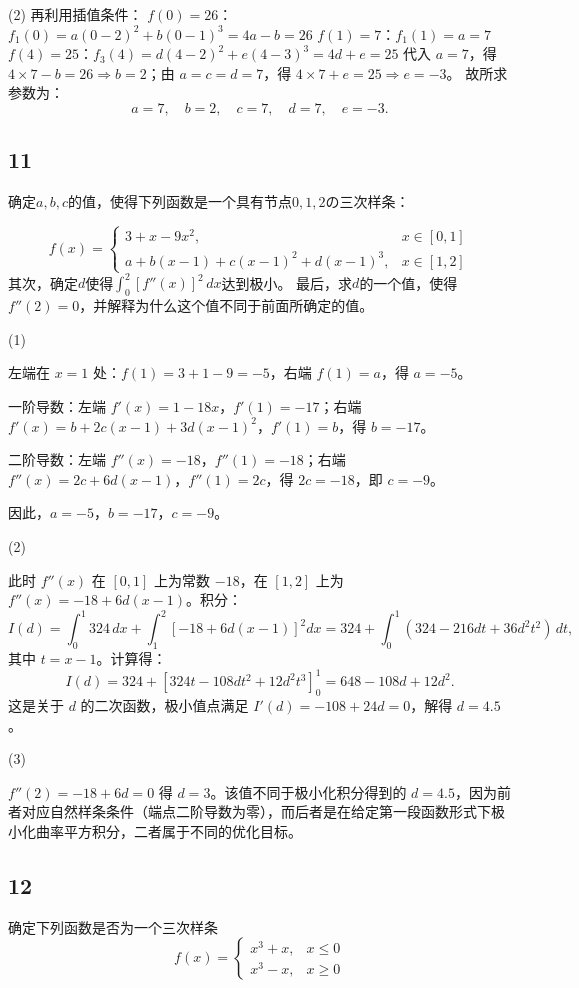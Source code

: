 \documentclass{article}
\begin{document}
(2)
再利用插值条件：
\(f(0)=26\)：\(f_1(0)=a(0-2)^2+b(0-1)^3=4a-b=26\)
\(f(1)=7\)：\(f_1(1)=a=7\)
\(f(4)=25\)：\(f_3(4)=d(4-2)^2+e(4-3)^3=4d+e=25\)
代入 \(a=7\)，得 \(4\times7-b=26\Rightarrow b=2\)；由 \(a=c=d=7\)，得 \(4\times7+e=25\Rightarrow e=-3\)。
故所求参数为：
\[
a=7,\quad b=2,\quad c=7,\quad d=7,\quad e=-3.
\]

\subsection*{11}
确定$a,b,c$的值，使得下列函数是一个具有节点$0,1,2$の三次样条：

\[
f(x)=\begin{cases}
3+x-9x^2, & x\in[0,1] \\[2pt]
a+b(x-1)+c(x-1)^2+d(x-1)^3, & x\in[1,2]
\end{cases}
\]
其次，确定$d$使得$\int_{0}^{2}[f''(x)]^2  \,dx $达到极小。
最后，求$d$的一个值，使得$f''(2)=0$，并解释为什么这个值不同于前面所确定的值。

(1)

左端在 \(x = 1\) 处：\(f(1) = 3 + 1 - 9 = -5\)，右端 \(f(1) = a\)，得 \(a = -5\)。

一阶导数：左端 \(f'(x) = 1 - 18x\)，\(f'(1) = -17\)；右端 \(f'(x) = b + 2c(x-1) + 3d(x-1)^2\)，\(f'(1) = b\)，得 \(b = -17\)。

二阶导数：左端 \(f''(x) = -18\)，\(f''(1) = -18\)；右端 \(f''(x) = 2c + 6d(x-1)\)，\(f''(1) = 2c\)，得 \(2c = -18\)，即 \(c = -9\)。

因此，\(a = -5\)，\(b = -17\)，\(c = -9\)。

(2)

此时 \(f''(x)\) 在 \([0,1]\) 上为常数 \(-18\)，在 \([1,2]\) 上为 \(f''(x) = -18 + 6d(x-1)\)。积分：
\[
I(d) = \int_0^1 324 \, dx + \int_1^2 \left[-18 + 6d(x-1)\right]^2 dx = 324 + \int_0^1 (324 - 216d t + 36d^2 t^2) \, dt,
\]
其中 \(t = x-1\)。计算得：
\[
I(d) = 324 + \left[324t - 108d t^2 + 12d^2 t^3\right]_0^1 = 648 - 108d + 12d^2.
\]
这是关于 \(d\) 的二次函数，极小值点满足 \(I'(d) = -108 + 24d = 0\)，解得 \(d = 4.5\)。

(3)

\(f''(2) = -18 + 6d = 0\) 得 \(d = 3\)。该值不同于极小化积分得到的 \(d = 4.5\)，因为前者对应自然样条条件（端点二阶导数为零），而后者是在给定第一段函数形式下极小化曲率平方积分，二者属于不同的优化目标。

\subsection*{12}
确定下列函数是否为一个三次样条
\[
f(x)=\begin{cases}
x^3+x, & x\leqslant 0 \\[2pt]
x^3-x, & x\geqslant 0 
\end{cases}
\]
\end{document}

